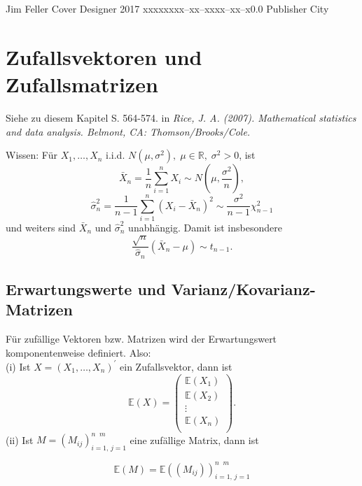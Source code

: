 \documentclass{tstextbook}
\begin{document}
       {Jim Feller}
       {Cover Designer}
       {2017}
       {xxxxx}{xxx--xx--xxxx--xx--x}{0.0}
       {Publisher}
       {City}



\chapter{Zufallsvektoren und Zufallsmatrizen}

\begin{book}
	Siehe zu diesem Kapitel S. 564-574. in \textit{Rice, J. A. (2007). Mathematical statistics and data analysis. Belmont, CA: Thomson/Brooks/Cole.} 
\end{book}




\begin{remark}
	Wissen: Für $ X_1, \ldots ,X_n $ i.i.d. $ N(\mu,\sigma^{2}), \; \mu\in\mathbb{R}, \; \sigma^2 > 0 $, ist 
	\[ \bar{X}_n = \frac{1}{n} \sum_{i=1}^{n} X_i \sim N\left(\mu, \frac{\sigma^2}{n} \right),
	\] 
	\[ \hat{\sigma}_n^2 = \frac{1}{n-1} \sum_{i=1}^{n} ( X_i - \bar{X}_n)^2 \sim \frac{\sigma^2}{n-1} \chi_{n-1}^2 
	\]  
	und weiters sind $ \bar{X}_n $  und $ \hat{\sigma}^2_n $ unabhängig. Damit ist insbesondere 
	\[ \frac{\sqrt{n}}{\hat{\sigma}_n}(\bar{X}_n-\mu) \sim t_{n-1}.
	\]
	
\end{remark}
 
 
 


\section{Erwartungswerte und Varianz/Kovarianz-Matrizen}


\begin{definition}[Erwartungswert]
	Für zufällige Vektoren bzw. Matrizen wird der Erwartungswert komponentenweise definiert. Also: \\
	(i) Ist $ X= \left(X_1, \ldots ,X_n\right)^\prime $  ein Zufallsvektor, dann ist 
\[ \mathbb{E}(X) = \begin{pmatrix} \mathbb{E}(X_1)\\
		\mathbb{E}(X_2)\\
		\vdots\\
		\mathbb{E}(X_n)\\
	\end{pmatrix}.
\]
	(ii) Ist $ M=(M_{ij})_{i=1,\, j=1}^{n \;\; m} $ eine zufällige Matrix, dann ist 
	
\[ 
\mathbb{E}(M)= \mathbb{E} \left((M_{ij})\right)_{i=1,\, j=1}^{n \;\; m}	
\]
\end{definition}
\end{document}
